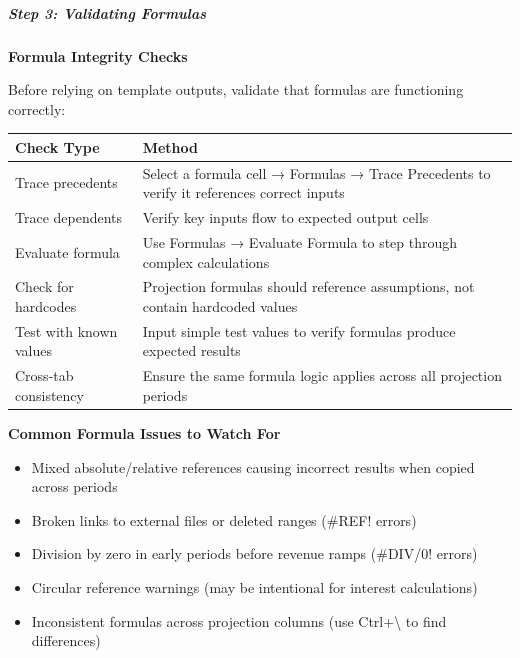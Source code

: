 \documentclass[11pt]{article}
\begin{document}
\subparagraph{Step 3: Validating Formulas}\mbox{}\par

\textbf{Formula Integrity Checks}


Before relying on template outputs, validate that formulas are functioning correctly:


\begingroup
\small
\setlength{\tabcolsep}{2pt}
\begin{longtable}{>{\RaggedRight\arraybackslash\hspace{0pt}}p{}>{\RaggedRight\arraybackslash\hspace{0pt}}p{}}
\toprule
{} \textbf{Check Type} & \textbf{Method} \\
\midrule
{} Trace precedents & Select a formula cell → Formulas → Trace Precedents to verify it references correct inputs \\
{} Trace dependents & Verify key inputs flow to expected output cells \\
{} Evaluate formula & Use Formulas → Evaluate Formula to step through complex calculations \\
{} Check for hardcodes & Projection formulas should reference assumptions, not contain hardcoded values \\
{} Test with known values & Input simple test values to verify formulas produce expected results \\
{} Cross-tab consistency & Ensure the same formula logic applies across all projection periods \\
\bottomrule
\end{longtable}
\endgroup

\textbf{Common Formula Issues to Watch For}

\begin{itemize}[leftmargin=*,itemsep=2pt,topsep=2pt]
\item {} Mixed absolute/relative references causing incorrect results when copied across periods
\item {} Broken links to external files or deleted ranges (\#REF! errors)
\item {} Division by zero in early periods before revenue ramps (\#DIV/0! errors)
\item {} Circular reference warnings (may be intentional for interest calculations)
\item {} Inconsistent formulas across projection columns (use Ctrl+\textbackslash{} to find differences)
\end{itemize}
\end{document}
